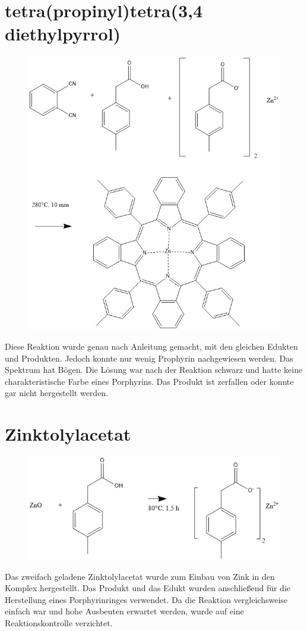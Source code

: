 \section{tetra(propinyl)tetra(3,4 diethylpyrrol)}
\begin{figure}[!htpb]
\centering
\includegraphics[scale=0.5]{graphics/tetrakis(methylphenyl)tetrakis(phenylpyrrolporphyrin}
\end{figure}
Diese Reaktion wurde genau nach Anleitung \cite{[16]} gemacht, mit den gleichen Edukten und Produkten. Jedoch konnte nur wenig Prophyrin nachgewiesen werden. Das Spektrum hat Bögen. Die Lösung war nach der Reaktion schwarz und hatte keine charakteristische Farbe eines Porphyrins. Das Produkt ist zerfallen oder konnte gar nicht hergestellt werden.
\section{Zinktolylacetat}
\begin{figure}[!htpb]
\centering
\includegraphics[scale=0.5]{graphics/zinktolylacetat}
\end{figure}
Das zweifach geladene Zinktolylacetat wurde zum Einbau von Zink in den Komplex hergestellt.
Das Produkt und das Edukt wurden anschließend für die Herstellung eines Porphyrinringes verwendet. Da die Reaktion vergleichsweise einfach war und hohe Ausbeuten erwartet werden, wurde auf eine Reaktionskontrolle verzichtet. 
